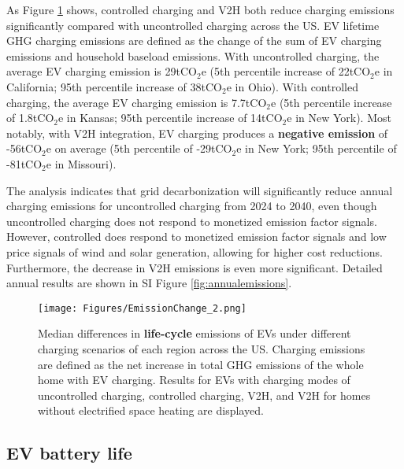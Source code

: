 \documentclass[11pt,preprint]{elsarticle}
\begin{document}
As Figure \ref{fig:emissionchange} shows, controlled charging and V2H both reduce charging emissions significantly compared with uncontrolled charging across the US. EV lifetime GHG charging emissions are defined as the change of the sum of EV charging emissions and household baseload emissions. With uncontrolled charging, the average EV charging emission is 29tCO$_2$e (5th percentile increase of 22tCO$_2$e in California; 95th percentile increase of 38tCO$_2$e in Ohio). With controlled charging, the average EV charging emission is 7.7tCO$_2$e (5th percentile increase of 1.8tCO$_2$e in Kansas; 95th percentile increase of 14tCO$_2$e in New York). Most notably, with V2H integration, EV charging produces a \textbf{negative emission} of -56tCO$_2$e on average (5th percentile of -29tCO$_2$e in New York; 95th percentile of -81tCO$_2$e in Missouri). 

The analysis indicates that grid decarbonization will significantly reduce annual charging emissions for uncontrolled charging from 2024 to 2040, even though uncontrolled charging does not respond to monetized emission factor signals. However, controlled does respond to monetized emission factor signals and low price signals of wind and solar generation, allowing for higher cost reductions. Furthermore, the decrease in V2H emissions is even more significant. Detailed annual results are shown in SI Figure \ref{fig:annualemissions}.

\begin{figure}[H]
    \centering
    \texttt{[image: Figures/EmissionChange\_2.png]}
    \caption{Median differences in \textbf{life-cycle} emissions of EVs under different charging scenarios of each region across the US. Charging emissions are defined as the net increase in total GHG emissions of the whole home with EV charging. Results for EVs with charging modes of uncontrolled charging, controlled charging, V2H, and V2H for homes without electrified space heating are displayed.}
    \label{fig:emissionchange}
\end{figure}

\subsection{EV battery life}
\end{document}
